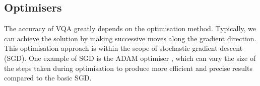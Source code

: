 \subsection{Optimisers} \label{Sec: Optimisers}
The accuracy of VQA greatly depends on the optimisation method.
Typically, we can achieve the solution by making successive moves along the gradient direction.
This optimisation approach is within the scope of stochastic gradient descent (SGD).
One example of SGD is the ADAM optimiser \cite{kingmaAdamMethodStochastic2014}, which can vary the size of the steps taken during optimisation to produce more efficient and precise results compared to the basic SGD.